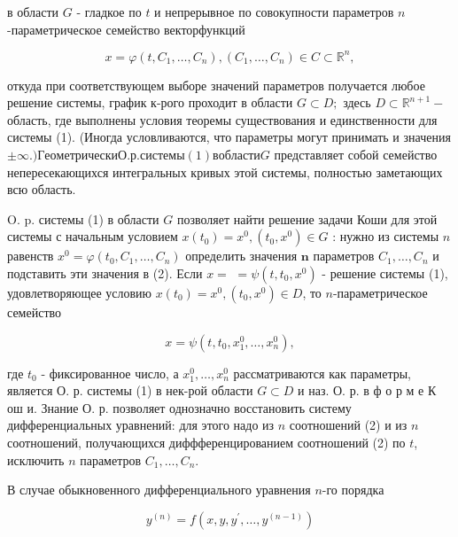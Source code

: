 \documentclass[10pt]{article}
\begin{document}
в области $G$ - гладкое по $t$ и непрерывное по совокупности параметров $n$-параметрическое семейство векторфункций



\[

x=\varphi\left(t, C_{1}, \ldots, C_{n}\right),\left(C_{1}, \ldots, C_{n}\right) \in C \subset \mathbb{R}^{n},

\]



откуда при соответствующем выборе значений параметров получается любое решение системы, график к-рого проходит в области $G \subset D ;$ здесь $D \subset \mathbb{R}^{n+1}-$ область, где выполнены условия теоремы существования и единственности для системы (1). (Иногда условливаются, что параметры могут принимать и значения $\pm \infty$.$) Геометрически О. р. системы (1) в области G$ представляет собой семейство непересекающихся интегральных кривых этой системы, полностью заметающих всю область.



O. p. системы (1) в области $G$ позволяет найти решение задачи Коши для этой системы с начальным условием $x\left(t_{0}\right)=x^{0},\left(t_{0}, x^{0}\right) \in G$ : нужно из системы $n$ равенств $x^{0}=\varphi\left(t_{0}, C_{1}, \ldots, C_{n}\right)$ определить значения $\boldsymbol{n}$ параметров $C_{1}, \ldots, C_{n}$ и подставить эти значения в (2). Если $x=$ $=\psi\left(t, t_{0}, x^{0}\right)$ - решение системы (1), удовлетворяющее условию $x\left(t_{0}\right)=x^{0},\left(t_{0}, x^{0}\right) \in D$, то $n$-параметрическое семейство



\[

x=\psi\left(t, t_{0}, x_{1}^{0}, \ldots, x_{n}^{0}\right),

\]



где $t_{0}$ - фиксированное число, а $x_{1}^{0}, \ldots, x_{n}^{0}$ рассматриваются как параметры, является О. р. системы (1) в нек-рой области $G \subset D$ и наз. О. р. в ф о р м е К ош и. Знание О. р. позволяет однозначно восстановить систему дифференциальных уравнений: для этого надо из $n$ соотношений (2) и из $n$ соотношений, получающихся диффференцированием соотношений (2) по $t$, исключить $n$ параметров $C_{1}, \ldots, C_{n}$.



В случае обыкновенного дифференциального уравнения $n$-го порядка



\[

y^{(n)}=f\left(x, y, y^{\prime}, \ldots, y^{(n-1)}\right)

\]
\end{document}
